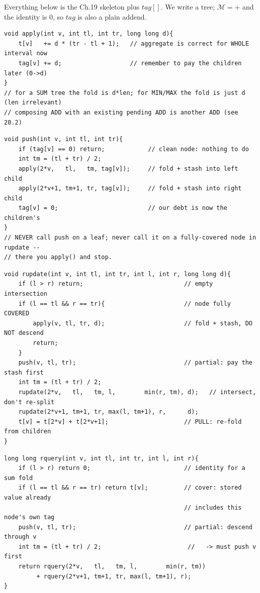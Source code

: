 Everything below is the Ch.19 skeleton plus \(\mathit{tag}[]\).  We write a  tree; \(\mathcal{M}=+\) and the identity is \(0\), so \(\mathit{tag}\) is also a plain addend.

\begin{lstlisting}[caption={apply: fold a tag into a node's aggregate AND stash it for its children}, label={lst:c15-apply}]
void apply(int v, int tl, int tr, long long d){
    t[v]   += d * (tr - tl + 1);   // aggregate is correct for WHOLE interval now
    tag[v] += d;                   // remember to pay the children later (0->d)
}
// for a SUM tree the fold is d*len; for MIN/MAX the fold is just d (len irrelevant)
// composing ADD with an existing pending ADD is another ADD (see 20.2)
\end{lstlisting}

\begin{lstlisting}[caption={push: hand the stash one level down, then clear -- only when forced to descend}, label={lst:c15-push}]
void push(int v, int tl, int tr){
    if (tag[v] == 0) return;            // clean node: nothing to do
    int tm = (tl + tr) / 2;
    apply(2*v,   tl,   tm, tag[v]);     // fold + stash into left child
    apply(2*v+1, tm+1, tr, tag[v]);     // fold + stash into right child
    tag[v] = 0;                         // our debt is now the children's
}
// NEVER call push on a leaf; never call it on a fully-covered node in rupdate --
// there you apply() and stop.
\end{lstlisting}

\begin{lstlisting}[caption={range update: add d to A[l..r] in O(log n)}, label={lst:c15-rupdate}]
void rupdate(int v, int tl, int tr, int l, int r, long long d){
    if (l > r) return;                            // empty intersection
    if (l == tl && r == tr){                      // node fully COVERED
        apply(v, tl, tr, d);                      // fold + stash, DO NOT descend
        return;
    }
    push(v, tl, tr);                              // partial: pay the stash first
    int tm = (tl + tr) / 2;
    rupdate(2*v,   tl,   tm, l,        min(r, tm), d);   // intersect, don't re-split
    rupdate(2*v+1, tm+1, tr, max(l, tm+1), r,      d);
    t[v] = t[2*v] + t[2*v+1];                     // PULL: re-fold from children
}
\end{lstlisting}

\begin{lstlisting}[caption={range query: sum of A[l..r] in O(log n); push only when you must}, label={lst:c15-rquery}]
long long rquery(int v, int tl, int tr, int l, int r){
    if (l > r) return 0;                          // identity for a sum fold
    if (l == tl && r == tr) return t[v];          // cover: stored value already
                                                  // includes this node's own tag
    push(v, tl, tr);                              // partial: descend through v
    int tm = (tl + tr) / 2;                        //   -> must push v first
    return rquery(2*v,   tl,   tm, l,        min(r, tm))
         + rquery(2*v+1, tm+1, tr, max(l, tm+1), r);
}
\end{lstlisting}

